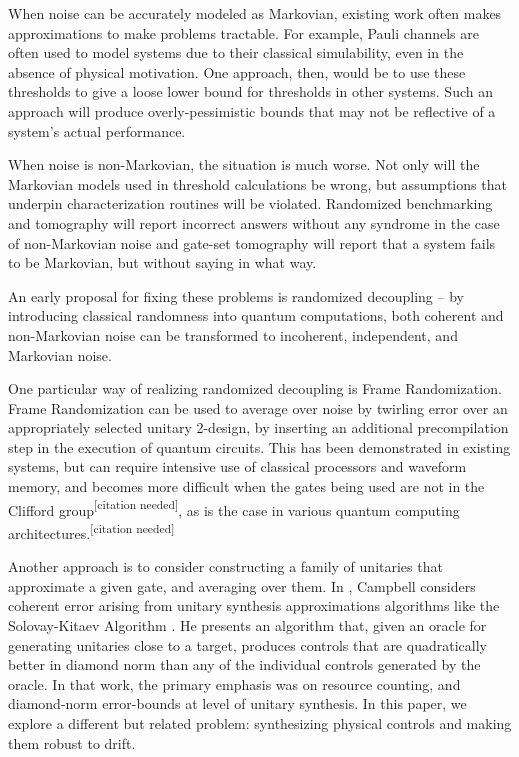 \documentclass[aps,nofootinbib,pra,notitlepage,twocolumn]{revtex4-1}
\newcommand{\needcite}{{\color{blue}\textsuperscript{[citation needed]}}}
\begin{document}
When noise can be accurately modeled as Markovian, existing work often makes approximations to make problems tractable. For example, Pauli channels are often used to model systems due to their classical simulability\cite{quant-ph/9807006}, even in the absence of physical motivation\cite{Aliferis2007, Knill2005, Wang2011, DuclosCianci2010, Wootton2012, Bombin2012, Puzzuoli2014, aliferis2008accuracy}. One approach, then, would be to use these thresholds to give a loose lower bound for thresholds in other systems\cite{Puzzuoli2014}. Such an approach will produce overly-pessimistic bounds that may not be reflective of a system's actual performance.

When noise is non-Markovian, the situation is much worse. Not only will the Markovian models used in threshold calculations be wrong, but assumptions that underpin characterization routines will be violated. Randomized benchmarking and tomography will report incorrect answers without any syndrome in the case of non-Markovian noise \cite{Merkel2013} and gate-set tomography will report that a system fails to be Markovian, but without saying in what way. 

An early proposal for fixing these problems is randomized decoupling\cite{Viola2005, Viola} -- by introducing classical randomness into quantum computations, both coherent and non-Markovian noise can be transformed to incoherent, independent, and Markovian noise. 

One particular way of realizing randomized decoupling is Frame Randomization\cite{Wallman2016, Ware2018}. Frame Randomization can be used to average over noise by twirling error over an appropriately selected unitary 2-design, by inserting an additional precompilation step in the execution of quantum circuits.\cite{roy2009unitary} This has been demonstrated in existing systems\cite{Ware2018}, but can require intensive use of classical processors and waveform memory, and becomes more difficult when the gates being used are not in the Clifford group\needcite, as is the case in various quantum computing architectures.\needcite

Another approach is to consider constructing a family of unitaries that approximate a given gate, and averaging over them. In \cite{Campbell2017}, Campbell considers coherent error arising from unitary synthesis approximations algorithms like the Solovay-Kitaev Algorithm \cite{1612.01011}. He presents an algorithm that, given an oracle for generating unitaries close to a target, produces controls that are quadratically better in diamond norm than any of the individual controls generated by the oracle. In that work, the primary emphasis was on resource counting, and diamond-norm error-bounds at level of unitary synthesis. In this paper, we explore a different but related problem: synthesizing physical controls and making them robust to drift.
\end{document}
